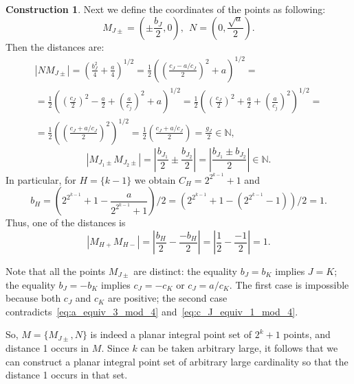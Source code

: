 \documentclass[a4paper,14pt]{article} %
\theoremstyle{plain}
\theoremstyle{definition}
\newtheorem{construction}[theorem]{Construction}
\begin{document}
\begin{construction}
	Next we define the coordinates of the points as following:
	\begin{equation}
		M_{J\pm} =\left(\pm\frac{b_J}{2}, 0\right)
		,
		~~
		N   =\left(0, \frac{\sqrt{a}}{2}\right)
		.
	\end{equation}
	Then the distances are:
	\begin{multline}
		|N M_{J\pm}|
		=
		\left(\frac{b_J^2}{4} + \frac{a}{4}\right)^{1/2}
		=
		\frac{1}{2}\left(\left(\frac{c_J - a/c_J}{2}\right)^2 + a\right)^{1/2}
		=
		\\=
		\frac{1}{2}\left( \left(\frac{c_J}{2}\right)^2 - \frac{a}{2} + \left(\frac{a}{c_j}\right)^2 + a\right)^{1/2}
		=
		\frac{1}{2}\left( \left(\frac{c_J}{2}\right)^2 + \frac{a}{2} + \left(\frac{a}{c_j}\right)^2    \right)^{1/2}
		=
		\\=
		\frac{1}{2}\left(\left(\frac{c_J + a/c_J}{2}\right)^2\right)^{1/2}
		=
		\frac{1}{2}\left(\frac{c_J + a/c_J}{2}\right)
		=
		\frac{g_J}{2}
		\in\mathbb{N}
		,
	\end{multline}
	\begin{equation}
		|M_{J_1 \pm}  M_{J_2 \pm}|
		=
		\left|\frac{b_{J_1}}{2} \pm \frac{b_{J_2}}{2}\right|
		=
		\left|\frac{b_{J_1} \pm b_{J_2}}{2}\right|
		\in\mathbb{N}
		.
	\end{equation}
	In particular, for $H = \{k-1\}$ we obtain $C_H = 2^{2^{k-1}}+1$ and
	\begin{equation}
		b_H =
		\left( 2^{2^{k-1}}+1 - \frac{a}{2^{2^{k-1}}+1} \right)/2
		=
		\left(2^{2^{k-1}}+1 - \left(  2^{2^{k-1}}-1 \right) \right)/2
		=
		1
		.
	\end{equation}
	Thus, one of the distances is
	\begin{equation}
		|M_{H+}  M_{H-}|
		=
		\left|\frac{b_{H}}{2} - \frac{-b_{H}}{2}\right|
		=
		\left|\frac{1}{2} - \frac{-1}{2}\right|
		= 1
		.
	\end{equation}

	Note that all the points $M_{J\pm}$ are distinct:
	the equality $b_J =  b_K$ implies $J=K$;
	the equality $b_J = -b_K$ implies $c_J = -c_K$ or $c_J = a / c_K$.
	The first case is impossible because both $c_J$ and $c_K$ are positive;
	the second case contradicts~\eqref{eq:a_equiv_3_mod_4} and~\eqref{eq:c_J_equiv_1_mod_4}.


	So, $M = \{ M_{J\pm}, N\}$ is indeed a planar integral point set of $2^k+1$ points,
	and distance 1 occurs in $M$.
	Since $k$ can be taken arbitrary large, it follows that we can construct
	a planar integral point set of arbitrary large cardinality so that the distance 1 occurs in that set.
\end{construction}
\end{document}
